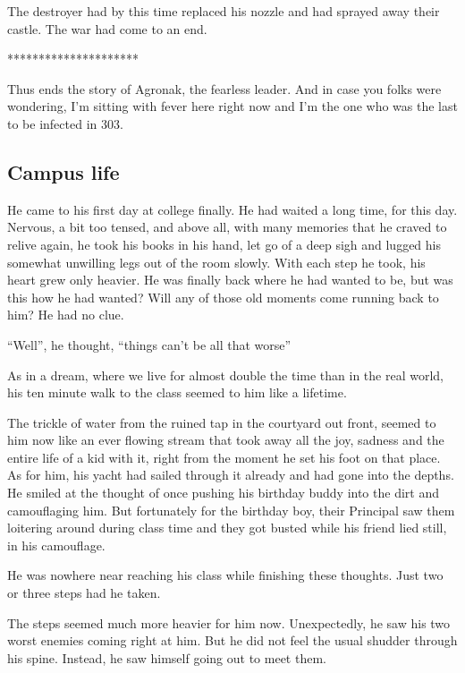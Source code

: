 \documentclass[twoside,11pt,titlepage]{article}
\begin{document}
The destroyer had by this time replaced his nozzle and had sprayed away their castle. The war had come to an end.

\bigskip
\begin{center}
*********************
\end{center}


Thus ends the story of Agronak, the fearless leader. And in case you folks were wondering, I'm sitting with fever here right now and I'm the one who was the last to be infected in 303.

\newpage
\begin{center}
  \section{Campus life}
\end{center}
\bigskip
\bigskip
\bigskip


He came to his first day at college finally. He had waited a long time, for this day. Nervous, a bit too tensed, and above all, with many memories that he craved to relive again, he took his books in his hand, let go of a deep sigh and lugged his somewhat unwilling legs out of the room slowly. With each step he took, his heart grew only heavier. He was finally back where he had wanted to be, but was this how he had wanted? Will any of those old moments come running back to him? He had no clue.

``Well'', he thought, ``things can't be all that worse''

As in a dream, where we live for almost double the time than in the real world, his ten minute walk to the class seemed to him like a lifetime.

The trickle of water from the ruined tap in the courtyard out front, seemed to him now like an ever flowing stream that took away all the joy, sadness and the entire life of a kid with it, right from the moment he set his foot on that place. As for him, his yacht had sailed through it already and had gone into the depths. He smiled at the thought of once pushing his birthday buddy into the dirt and camouflaging him. But fortunately for the birthday boy, their Principal saw them loitering around during class time and they got busted while his friend lied still, in his camouflage.

He was nowhere near reaching his class while finishing these thoughts. Just two or three steps had he taken.

The steps seemed much more heavier for him now. Unexpectedly, he saw his two worst enemies coming right at him. But he did not feel the usual shudder through his spine. Instead, he saw himself going out to meet them.
\end{document}
